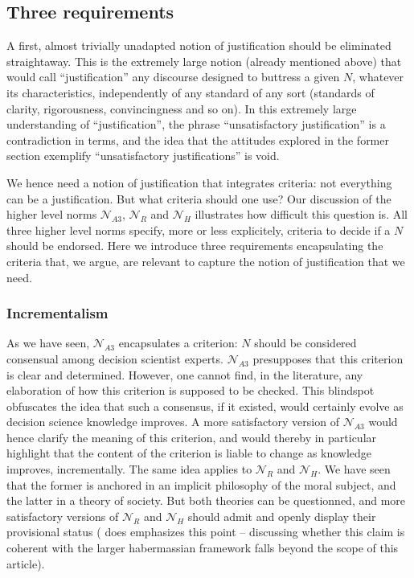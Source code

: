 \documentclass[preprint, french, english, 11pt, authoryear]{elsarticle}%
\begin{document}
\subsection{Three requirements}
A first, almost trivially unadapted notion of justification should be eliminated straightaway. This is the extremely large notion (already mentioned above) that would call ``justification'' any discourse designed to buttress a given $N$, whatever its characteristics, independently of any standard of any sort (standards of clarity, rigorousness, convincingness and so on). In this extremely large understanding of ``justification'', the phrase ``unsatisfactory justification'' is a contradiction in terms, and the idea that the attitudes explored in the former section exemplify ``unsatisfactory justifications'' is void.

We hence need a notion of justification that integrates criteria: not everything can be a justification. But what criteria should one use? Our discussion of the higher level norms $\mathscr{N}_{A3}$, $\mathscr{N}_{R}$ and $\mathscr{N}_{H}$ illustrates how difficult this question is. All three higher level norms specify, more or less explicitely, criteria to decide if a $N$ should be endorsed. Here we introduce three requirements encapsulating the criteria that, we argue, are relevant to capture the notion of justification that we need.

\subsubsection{Incrementalism}
As we have seen, $\mathscr{N}_{A3}$ encapsulates a criterion: $N$ should be considered consensual among decision scientist experts. $\mathscr{N}_{A3}$ presupposes that this criterion is clear and determined. However, one cannot find, in the literature, any elaboration of how this criterion is supposed to be checked. This blindspot obfuscates the idea that such a consensus, if it existed, would certainly evolve as decision science knowledge improves. A more satisfactory version of $\mathscr{N}_{A3}$ would hence clarify the meaning of this criterion, and would thereby in particular highlight that the content of the criterion is liable to change as knowledge improves, incrementally. The same idea applies to $\mathscr{N}_{R}$ and $\mathscr{N}_{H}$. We have seen that the former is anchored in an implicit philosophy of the moral subject, and the latter in a theory of society. But both theories can be questionned, and more satisfactory versions of $\mathscr{N}_{R}$ and $\mathscr{N}_{H}$ should admit and openly display their provisional status (\cite{habermas_moralbewustsein_1983} does emphasizes this point -- discussing whether this claim is coherent with the larger habermassian framework falls beyond the scope of this article).
\end{document}
